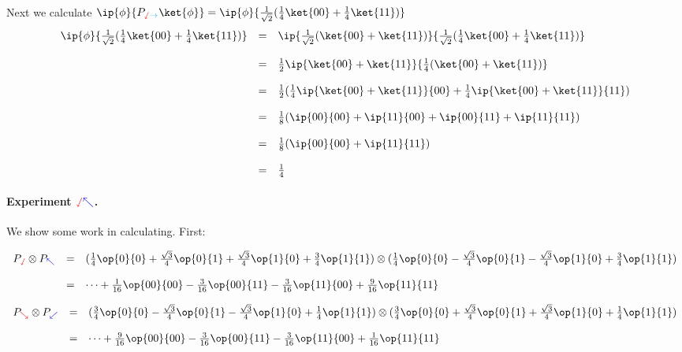 \documentclass{article}
\newcommand{\xplus}{{\color{cyan}\rightarrow}}
\newcommand{\yplus}{{\color{blue}\nwarrow}}
\newcommand{\yminus}{{\color{blue}\swarrow}}
\newcommand{\zplus}{{\color{red}\sswarrow}}
\newcommand{\zminus}{{\color{red}\searrow}}
\theoremstyle{remark}
\def\srtt{\frac{1}{\sqrt{2}}}
\begin{document}
Next we calculate 
$\ip{\phi}{P_{\zplus\xplus}\ket{\phi}} 
= \ip{\phi}{\srtt(\frac{1}{4}\ket{00} + \frac{1}{4}\ket{11})}$
\[
    \begin{array}{rcl}
        \ip{\phi}{\srtt(\frac{1}{4}\ket{00} + \frac{1}{4}\ket{11})} 
        &=& 
        \ip{\srtt(\ket{00} + \ket{11})}{\srtt(\frac{1}{4}\ket{00} + \frac{1}{4}\ket{11})} 
        \\ \\
        &=& \frac{1}{2}\ip{\ket{00} + \ket{11}}{\frac{1}{4}(\ket{00} + \ket{11})}
        \\ \\
        &=& \frac{1}{2}(\frac{1}{4}\ip{\ket{00} + \ket{11}}{00} 
        + \frac{1}{4}\ip{\ket{00} + \ket{11}}{11})
        \\ \\
        &=& \frac{1}{8}(\ip{00}{00} + \ip{11}{00} + \ip{00}{11} + \ip{11}{11} )
        \\ \\
        &=& \frac{1}{8}(\ip{00}{00} + \ip{11}{11})
        \\ \\
        &=& \frac{1}{4}
    \end{array}
\]




\paragraph*{Experiment $\zplus\yplus$.} 
We show some work in calculating. First:

\[
    \begin{array}{rcl}
    P_{\zplus}\otimes P_{\yplus}
        &=& 
            (\frac{1}{4} \op{0}{0} 
                + \frac{\sqrt{3}}{4} \op{0}{1} 
                + \frac{\sqrt{3}}{4} \op{1}{0} 
                + \frac{3}{4} \op{1}{1})
        \otimes (\frac{1}{4} \op{0}{0} 
                - \frac{\sqrt{3}}{4} \op{0}{1} 
                - \frac{\sqrt{3}}{4} \op{1}{0} 
                + \frac{3}{4} \op{1}{1})
        \\ \\
        &=& \dots 
        + \frac{1}{16} \op{00}{00}
        - \frac{3}{16} \op{00}{11}
        - \frac{3}{16} \op{11}{00}
        + \frac{9}{16} \op{11}{11}
    \end{array}
\]

\[\begin{array}{rcl}
    P_{\zminus}\otimes P_{\yminus}
        &=& (\frac{3}{4} \op{0}{0} 
            - \frac{\sqrt{3}}{4} \op{0}{1} 
            - \frac{\sqrt{3}}{4} \op{1}{0} 
            + \frac{1}{4} \op{1}{1})
        \otimes (\frac{3}{4} \op{0}{0} 
            + \frac{\sqrt{3}}{4} \op{0}{1} 
            + \frac{\sqrt{3}}{4} \op{1}{0} 
            + \frac{1}{4} \op{1}{1})
            \\ \\
        &=& \dots 
        + \frac{9}{16} \op{00}{00}
        - \frac{3}{16} \op{00}{11}
        - \frac{3}{16} \op{11}{00}
        + \frac{1}{16} \op{11}{11}
    \end{array}
\]
\end{document}
